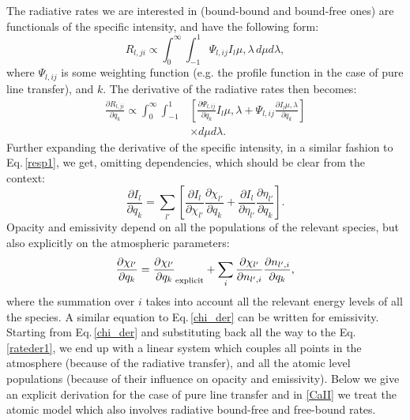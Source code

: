 \documentclass{aa}
\begin{document}
The radiative rates we are interested in (bound-bound and bound-free ones) are functionals of the specific intensity, and have the following form:
\begin{equation}
 R_{l,ji} \propto \int_0^{\infty} \int_{-1}^{1} \Psi_{l,ij} I_l{\mu,\lambda}\,d\mu d\lambda,
\end{equation}
where $\Psi_{l,ij}$ is some weighting function (e.g. the profile function in the case of pure line transfer), and $k$. The derivative of the radiative rates then becomes: 
\begin{align}
 \frac{\partial R_{l,ji}}{\partial q_k} \propto \int_0^{\infty} \int_{-1}^{1} & \left [ \frac{\partial\Psi_{l,ij}}{\partial q_k} I_l{\mu,\lambda} + \Psi_{l,ij} \frac{\partial I_l{\mu,\lambda}}{\partial q_k} \right ] \nonumber \\
 & \times d\mu d\lambda.
\end{align}
Further expanding the derivative of the specific intensity, in a similar fashion to Eq.\,\ref{resp1}, we get, omitting dependencies, which should be clear from the context:
\begin{equation}
 \frac{\partial I_l}{\partial q_k} = \sum_{l'} \left[ \frac{\partial I_l}{\partial \chi_{l'}} \frac{\partial\chi_{l'}}{\partial q_k} + \frac{\partial I_l}{\partial \eta_{l'}} \frac{\partial\eta_{l'}}{\partial q_k} \right ].
\end{equation}
Opacity and emissivity depend on all the populations of the relevant species, but also explicitly on the atmospheric parameters:
\begin{equation}
\frac{\partial\chi_{l'}}{\partial q_k} = \frac{\partial\chi_{l'}}{\partial q_k}_{\rm{explicit}} + \sum_i \frac{\partial\chi_{l'}}{\partial n_{l',i}} \frac{\partial n_{l',i}}{\partial q_k},
\label{chi_der}
\end{equation}
where the summation over $i$ takes into account all the relevant energy levels of all the species. A similar equation to Eq.\,\ref{chi_der} can be written for emissivity. Starting from Eq.\,\ref{chi_der} and substituting back all the way to the Eq.\,\ref{rateder1}, we end up with a linear system which couples all points in the atmosphere (because of the radiative transfer), and all the atomic level populations (because of their influence on opacity and emissivity). Below we give an explicit derivation for the case of pure line transfer and in \ref{CaII} we treat the atomic model which also involves radiative bound-free and free-bound rates.
\end{document}
